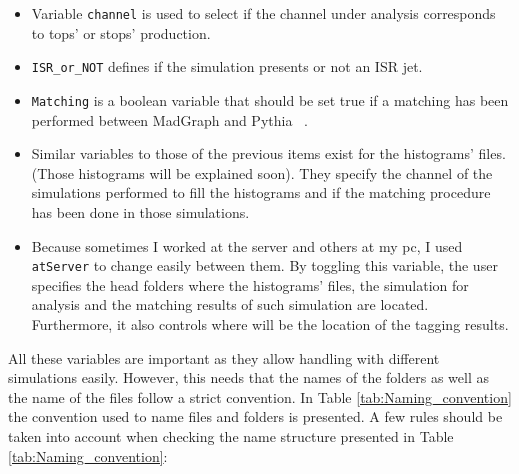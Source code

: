 \documentclass[12pt, oneside]{book}              %
\begin{document}
\begin{itemize}
\item Variable \texttt{channel} is used to select if the 
channel under analysis corresponds to tops' or stops' production. 
\item \texttt{ISR\_or\_NOT} defines if the simulation presents or not an ISR jet.
\item \texttt{Matching} is a boolean variable that should be set true if a matching
has been performed between MadGraph and Pythia ~\cite{matching}.
\item Similar variables to those of the previous items exist for the histograms' files.
(Those histograms will be explained soon). They specify the channel of the simulations 
performed to fill the histograms and if the matching procedure has been done in those 
simulations.
\item Because sometimes I worked at the server and others at my pc, I used \texttt{atServer}
to change easily between them. By toggling this variable, the user specifies the head folders
where the histograms' files, the simulation for analysis and the matching results of such
simulation are located. Furthermore, it also controls where will be the location
of the tagging results. 
\end{itemize}

All these variables are important as they allow handling with different simulations easily.
However, this needs that the names of the folders as well as the name of the files
follow a strict convention. In Table \ref{tab:Naming_convention}  the convention used to name 
files and folders is presented. A few rules should be taken into account when checking the
name structure presented in Table \ref{tab:Naming_convention}:
\end{document}
